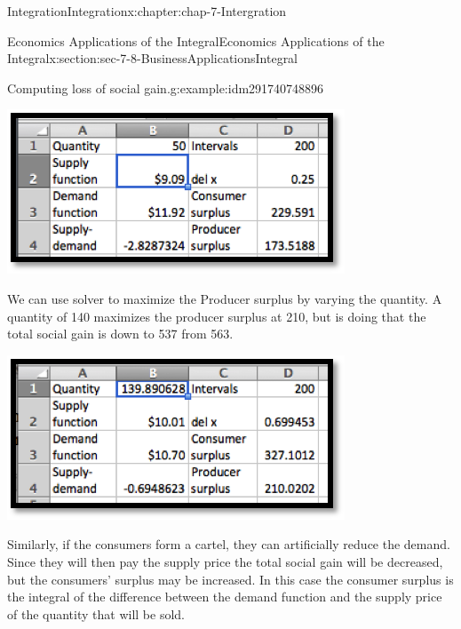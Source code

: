 \documentclass[oneside,10pt,]{book}
\numberwithin{equation}{section}
\begin{document}
\begin{chapterptx}{Integration}{}{Integration}{}{}{x:chapter:chap-7-Intergration}
\begin{sectionptx}{Economics Applications of the Integral}{}{Economics Applications of the Integral}{}{}{x:section:sec-7-8-BusinessApplicationsIntegral}
\begin{example}{Computing loss of social gain.}{g:example:idm291740748896}
\begin{sidebyside}{1}{0.25}{0.25}{0}
\begin{sbspanel}{0.5}
\includegraphics[width=\linewidth]{images/sec7-8-12.png}
\end{sbspanel}%
\end{sidebyside}%
\par
We can use solver to maximize the Producer surplus by varying the quantity.  A quantity of 140 maximizes the producer surplus at \textdollar{}210, but is doing that the total social gain is down to \textdollar{}537 from \textdollar{}563.%
\begin{sidebyside}{1}{0.25}{0.25}{0}%
\begin{sbspanel}{0.5}%
\includegraphics[width=\linewidth]{images/sec7-8-13.png}
\end{sbspanel}%
\end{sidebyside}%
\end{example}
Similarly, if the consumers form a cartel, they can artificially reduce the demand.  Since they will then pay the supply price the total social gain will be decreased, but the consumers’ surplus may be increased.  In this case the consumer surplus is the integral of the difference between the demand function and the supply price of the quantity that will be sold.%
\begin{sidebyside}{1}{0.2}{0.2}{0}%
\begin{sbspanel}{0.6}%

\end{sbspanel}
\end{sidebyside}
\end{sectionptx}
\end{chapterptx}
\end{document}
